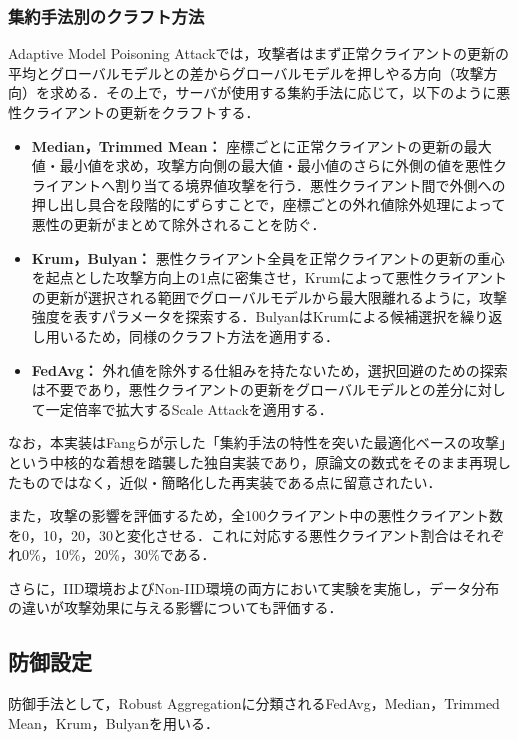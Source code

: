 \documentclass[a4j, twocolumn, dvipdfmx]{jsarticle}  %
\begin{document}
\subsubsection*{集約手法別のクラフト方法}

Adaptive Model Poisoning Attackでは，攻撃者はまず正常クライアントの更新の平均とグローバルモデルとの差からグローバルモデルを押しやる方向（攻撃方向）を求める．その上で，サーバが使用する集約手法に応じて，以下のように悪性クライアントの更新をクラフトする．

\begin{itemize}
\item \textbf{Median，Trimmed Mean：} 座標ごとに正常クライアントの更新の最大値・最小値を求め，攻撃方向側の最大値・最小値のさらに外側の値を悪性クライアントへ割り当てる境界値攻撃を行う．悪性クライアント間で外側への押し出し具合を段階的にずらすことで，座標ごとの外れ値除外処理によって悪性の更新がまとめて除外されることを防ぐ．
\item \textbf{Krum，Bulyan：} 悪性クライアント全員を正常クライアントの更新の重心を起点とした攻撃方向上の1点に密集させ，Krumによって悪性クライアントの更新が選択される範囲でグローバルモデルから最大限離れるように，攻撃強度を表すパラメータを探索する．BulyanはKrumによる候補選択を繰り返し用いるため，同様のクラフト方法を適用する．
\item \textbf{FedAvg：} 外れ値を除外する仕組みを持たないため，選択回避のための探索は不要であり，悪性クライアントの更新をグローバルモデルとの差分に対して一定倍率で拡大するScale Attackを適用する．
\end{itemize}

なお，本実装はFangらが示した「集約手法の特性を突いた最適化ベースの攻撃」という中核的な着想を踏襲した独自実装であり，原論文の数式をそのまま再現したものではなく，近似・簡略化した再実装である点に留意されたい．

また，攻撃の影響を評価するため，全100クライアント中の悪性クライアント数を0，10，20，30と変化させる．これに対応する悪性クライアント割合はそれぞれ0\%，10\%，20\%，30\%である．

さらに，IID環境およびNon-IID環境の両方において実験を実施し，データ分布の違いが攻撃効果に与える影響についても評価する．

\subsection{防御設定}

防御手法として，Robust Aggregationに分類されるFedAvg，Median，Trimmed Mean，Krum，Bulyanを用いる．
\end{document}
